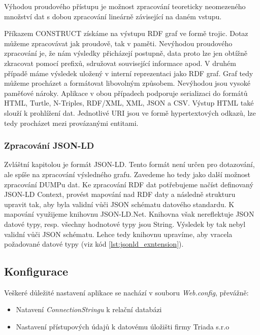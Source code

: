 Výhodou proudového přístupu je možnost zpracování teoreticky neomezeného množství dat s dobou zpracování lineárně závisející na daném vstupu.

Příkazem CONSTRUCT získáme na výstupu RDF graf ve formě trojic. Dotaz můžeme zpracovávat jak proudově, tak v paměti. Nevýhodou proudového zpracování je, že nám výsledky přicházejí postupně, data proto lze jen obtížně zkracovat pomocí prefixů, sdružovat související informace apod. V druhém případě máme výsledek uložený v interní reprezentaci jako RDF graf. Graf tedy můžeme procházet a formátovat libovolným způsobem. Nevýhodou jsou vysoké paměťové nároky. Aplikace v obou případech podporuje serializaci do formátů HTML, Turtle, N-Triples, RDF/XML, XML, JSON a CSV. Výstup HTML také slouží k prohlížení dat. Jednotlivé URI jsou ve formě hypertextových odkazů, lze tedy procházet mezi provázanými entitami.

\subsubsection*{Zpracování JSON-LD}

Zvláštní kapitolou je formát JSON-LD. Tento formát není určen pro dotazování, ale spíše na zpracování výsledného grafu. Zavedeme ho tedy jako další možnost zpracování DUMPu dat. Ke zpracování RDF dat potřebujeme načíst definovaný JSON-LD Context, provést mapování nad RDF daty a následně strukturu upravit tak, aby byla validní vůči JSON schématu datového standardu. K mapování využijeme knihovnu JSON-LD.Net. Knihovna však nereflektuje JSON datové typy, resp. všechny hodnotové typy jsou String. Výsledek by tak nebyl validní vůči JSON schématu. Lehce tedy knihovnu upravíme, aby vracela požadované datové typy (viz kód \ref{lst:jsonld_exntension}).



\subsection{Konfigurace}

Veškeré důležité nastavení aplikace se nachází v souboru \textit{Web.config}, převážně:

\begin{itemize}
\item Natavení \textit{ConnectionStringu} k relační databázi
\item Nastavení přístupových údajů k datovému úložišti firmy Triada s.r.o
\end{itemize}

